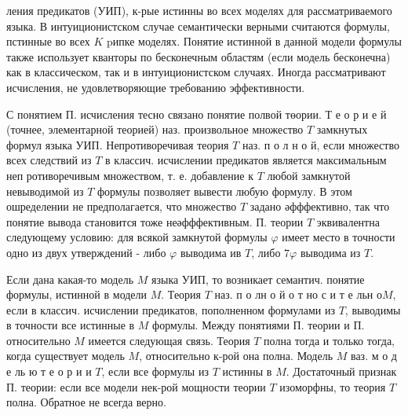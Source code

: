 \documentclass[10pt]{article}
\begin{document}
ления предикатов (УИП), к-рые истинны во всех моделях для рассматриваемого языка. В интуиционистском случае семантически верными считаются формулы, пстинные во всех $K$ pипке моделях. Понятие истинной в данной модели формулы также использует кванторы по бесконечным областям (если модель бесконечна) как в классическом, так и в интуиционистском случаях. Иногда рассматривают исчисления, не удовлетворяющие требованию эффективности.



С понятием П. исчисления тесно связано понятие полвой төории. Т е о р и е й (точнее, элементарной теорией) наз. произвольное множество $T$ замкнутых формул языка УИП. Непротиворечивая теория $T$ наз. п о л н о й, если множество всех следствий из $T$ в классич. исчислении предикатов является максимальным неп ротиворечивым множеством, т. е. добавление к $T$ любой замкнутой невыводимой из $T$ формулы позволяет вывести любую формулу. В этом ошределении не предполагается, что множество $T$ задано әфффективно, так что понятие вывода становится тоже неәфффективным. П. теории $T$ эквивалентна следующему условию: для всякой замкнутой формулы $\varphi$ имеет место в точности одно из двух утверждений - либо $\varphi$ выводима ив $T$, либо $7 \varphi$ выводима из $T$.



Если дана какая-то модель $M$ языка УИП, то возникает семантич. понятие формулы, истинной в модели $M$. Теория $T$ наз. п о лн о й о т но с и т е льн $о M$, если в классич. исчислении предикатов, пополненном формулами из $T$, выводимы в точности все истинные в $M$ формулы. Между понятиями П. теории и П. относительно $M$ имеется следующая связь. Теория $T$ полна тогда и только тогда, когда существует модель $M$, относительно к-рой она полна. Модель $M$ ваз. м о д е ль ю т е о р и и $T$, если все формулы из $T$ истинны в $M$. Достаточный признак П. теории: если все модели нек-рой мощности теории $T$ изоморфны, то теория $T$ полна. Обратное не всегда верно.
\end{document}
